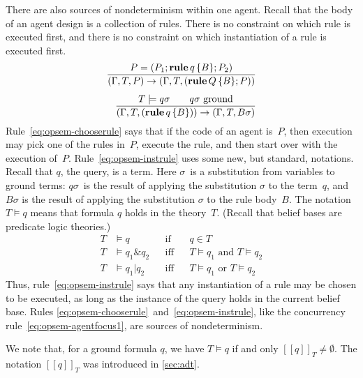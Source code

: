 \documentclass[a4paper,12pt,oneside,fleqn]{book} %
\newcommand{\eval}[1]{[\!\![#1]\!\!]}
\begin{document}
There are also sources of nondeterminism within one agent. Recall that the
body of an agent design is a collection of rules. There is no constraint on
which rule is executed first, and there is no constraint on which
instantiation of a rule is executed first.
\begin{align}
\frac
  {P = (P_1;{\bf rule}\,q\,\{B\};P_2)}
  {(\Gamma,T,P)\to(\Gamma,T,({\bf rule}\,Q\,\{B\};P))}
  \label{eq:opsem-chooserule}
\\[1ex]
\frac
  {T \models q \sigma \qquad\text{$q\sigma$ ground}}
  {(\Gamma,T,({\bf rule}\,q\,\{B\}))\to(\Gamma,T,B\sigma)}
  \label{eq:opsem-instrule}
\end{align}
Rule~\eqref{eq:opsem-chooserule} says that if the code of an agent is~$P$,
then execution may pick one of the rules in~$P$, execute the rule, and then
start over with the execution of~$P$. Rule~\eqref{eq:opsem-instrule} uses
some new, but standard, notations. Recall that $q$, the query, is a term.
Here $\sigma$~is a substitution from variables to ground terms: $q\sigma$~is the result of applying the substitution $\sigma$ to the term~$q$, and
$B\sigma$ is the result of applying the substitution $\sigma$ to the rule
body~$B$. The notation $T\models q$ means that formula $q$ holds in the
theory~$T$. (Recall that belief bases are predicate logic theories.)
\begin{align}
T &\models q  &&\text{if} && q\in T \\
T &\models q_1\&q_2 &&\text{iff} &&\text{$T\models q_1$ and $T\models q_2$}\\
T &\models q_1|q_2 &&\text{iff} &&\text{$T\models q_1$ or $T\models q_2$}
\end{align}
Thus, rule~\eqref{eq:opsem-instrule} says that any instantiation of a rule
may be chosen to be executed, as long as the instance of the query holds in
the current belief base. Rules
\eqref{eq:opsem-chooserule}~and~\eqref{eq:opsem-instrule}, like the
concurrency rule~\eqref{eq:opsem-agentfocus1}, are sources of
nondeterminism.

\begin{remark}
We note that, for a ground formula $q$,
  we have $T \models q$ if and only $\eval{q}_T\neq\emptyset$.
The notation $\eval{q}_T$ was introduced in \autoref{sec:adt}.
\end{remark}
\end{document}
